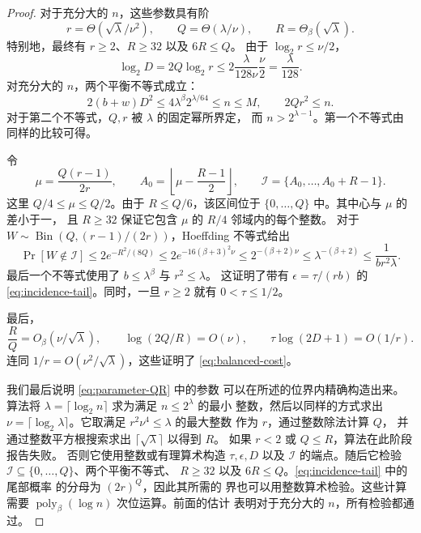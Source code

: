 \documentclass[11pt,reqno]{amsart}
\numberwithin{equation}{section}
\theoremstyle{definition}\newtheorem{definition}[theorem]{定义}
\theoremstyle{remark}\newtheorem{remark}[theorem]{注}
\newcommand{\poly}{\operatorname{poly}}
\renewcommand{\le}{\leqslant}
\renewcommand{\ge}{\geqslant}
\begin{document}
\begin{proof}
对于充分大的 $n$，这些参数具有阶
\[
 r=\Theta(\sqrt\lambda/\nu^2),\qquad
 Q=\Theta(\lambda/\nu),\qquad R=\Theta_\beta(\sqrt\lambda).
\]
特别地，最终有 $r\ge2$、$R\ge32$ 以及 $6R\le Q$。
由于 $\log_2 r\le\nu/2$，
\[
 \log_2 D=2Q\log_2 r
 \le2\frac{\lambda}{128\nu}\frac\nu2=\frac{\lambda}{128}.
\]
对充分大的 $n$，两个平衡不等式成立：
\[
 2(b+w)D^2\le4\lambda^\beta2^{\lambda/64}\le n\le M,
 \qquad 2Qr^2\le n.
\]
对于第二个不等式，$Q,r$ 被 $\lambda$ 的固定幂所界定，
而 $n>2^{\lambda-1}$。第一个不等式由同样的比较可得。

令
\[
 \mu=\frac{Q(r-1)}{2r},\qquad
 A_0=\left\lfloor\mu-\frac{R-1}{2}\right\rfloor,
 \qquad \mathcal I=\{A_0,\ldots,A_0+R-1\}.
\]
这里 $Q/4\le\mu\le Q/2$。由于 $R\le Q/6$，该区间位于
$\{0,\ldots,Q\}$ 中。其中心与 $\mu$ 的差小于一，
且 $R\ge32$ 保证它包含 $\mu$ 的 $R/4$ 邻域内的每个整数。
对于 $W\sim\operatorname{Bin}(Q,(r-1)/(2r))$，Hoeffding 不等式给出
\[
 \Pr[W\notin\mathcal I]
 \le2e^{-R^2/(8Q)}
 \le2e^{-16(\beta+3)^2\nu}
 \le2^{-(\beta+2)\nu}
 \le\lambda^{-(\beta+2)}
 \le\frac1{br^2\lambda}.
\]
最后一个不等式使用了 $b\le\lambda^\beta$ 与 $r^2\le\lambda$。
这证明了带有 $\epsilon=\tau/(rb)$ 的 \eqref{eq:incidence-tail}。同时，一旦 $r\ge2$ 就有 $0<\tau\le1/2$。

最后，
\[
 \frac RQ=O_\beta(\nu/\sqrt\lambda),\qquad
 \log(2Q/R)=O(\nu),\qquad
 \tau\log(2D+1)=O(1/r).
\]
连同 $1/r=O(\nu^2/\sqrt\lambda)$，这些证明了
\eqref{eq:balanced-cost}。

我们最后说明 \eqref{eq:parameter-QR} 中的参数
可以在所述的位界内精确构造出来。
算法将 $\lambda=\lceil\log_2 n\rceil$ 求为满足 $n\le2^\lambda$ 的最小
整数，然后以同样的方式求出
$\nu=\lceil\log_2\lambda\rceil$。它取满足 $r^2\nu^4\le\lambda$ 的最大整数
作为 $r$，通过整数除法计算 $Q$，
并通过整数平方根搜索求出 $\lceil\sqrt\lambda\rceil$ 以得到 $R$。
如果 $r<2$ 或 $Q\le R$，算法在此阶段报告失败。
否则它使用整数或有理算术构造 $\tau,\epsilon,D$ 以及
$\mathcal I$ 的端点。随后它检验
$\mathcal I\subseteq\{0,\ldots,Q\}$、两个平衡不等式、
$R\ge32$ 以及 $6R\le Q$。\eqref{eq:incidence-tail} 中的尾部概率
的分母为 $(2r)^Q$，因此其所需的
界也可以用整数算术检验。这些计算
需要 $\poly_\beta(\log n)$ 次位运算。前面的估计
表明对于充分大的 $n$，所有检验都通过。
\end{proof}
\end{document}
